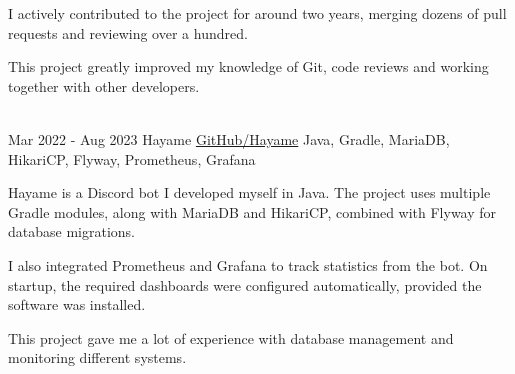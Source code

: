 \documentclass[letterpaper]{twentysecondcv_english}
\begin{document}
\begin{twenty}
{            I actively contributed to the project for around two years,
            merging dozens of pull requests and reviewing over a hundred.

            This project greatly improved my knowledge of Git,
            code reviews and working together with other developers.
        } \\

        \twentyitem
        {Mar 2022 -}
        {Aug 2023}
        {Hayame}
        {\href{https://github.com/Tais993/Hayame}{GitHub/Hayame}}
        {Java, Gradle, MariaDB, HikariCP, Flyway, Prometheus, Grafana}
        {
            Hayame is a Discord bot I developed myself in Java.
            The project uses multiple Gradle modules, along with MariaDB
        and HikariCP, combined with Flyway for database migrations.

        I also integrated Prometheus and Grafana to track statistics
        from the bot. On startup, the required dashboards were
        configured automatically, provided the software was installed.

        This project gave me a lot of experience with database
        management and monitoring different systems.
        }

    \end{twenty}

    \vspace{-10mm}
\end{document}
